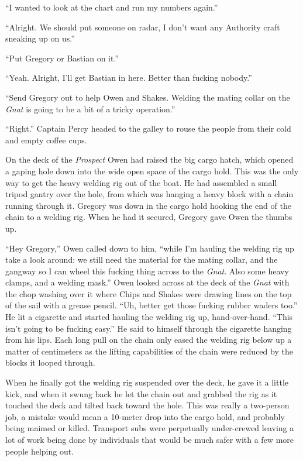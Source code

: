 \documentclass[
]{scrbook}
\begin{document}
``I wanted to look at the chart and run my numbers again.''

``Alright. We should put someone on radar, I don't want any Authority
craft sneaking up on us.''

``Put Gregory or Bastian on it.''

``Yeah. Alright, I'll get Bastian in here. Better than fucking nobody.''

``Send Gregory out to help Owen and Shakes. Welding the mating collar on
the \emph{Gnat} is going to be a bit of a tricky operation.''

``Right.'' Captain Percy headed to the galley to rouse the people from
their cold and empty coffee cups.

On the deck of the \emph{Prospect} Owen had raised the big cargo hatch,
which opened a gaping hole down into the wide open space of the cargo
hold. This was the only way to get the heavy welding rig out of the
boat. He had assembled a small tripod gantry over the hole, from which
was hanging a heavy block with a chain running through it. Gregory was
down in the cargo hold hooking the end of the chain to a welding rig.
When he had it secured, Gregory gave Owen the thumbs up.

``Hey Gregory,'' Owen called down to him, ``while I'm hauling the
welding rig up take a look around: we still need the material for the
mating collar, and the gangway so I can wheel this fucking thing across
to the \emph{Gnat}. Also some heavy clamps, and a welding mask.'' Owen
looked across at the deck of the \emph{Gnat} with the chop washing over
it where Chips and Shakes were drawing lines on the top of the sail with
a grease pencil. ``Uh, better get those fucking rubber waders too.'' He
lit a cigarette and started hauling the welding rig up, hand-over-hand.
``This isn't going to be fucking easy.'' He said to himself through the
cigarette hanging from his lips. Each long pull on the chain only eased
the welding rig below up a matter of centimeters as the lifting
capabilities of the chain were reduced by the blocks it looped through.

When he finally got the welding rig suspended over the deck, he gave it
a little kick, and when it swung back he let the chain out and grabbed
the rig as it touched the deck and tilted back toward the hole. This was
really a two-person job, a mistake would mean a 10-meter drop into the
cargo hold, and probably being maimed or killed. Transport subs were
perpetually under-crewed leaving a lot of work being done by individuals
that would be much safer with a few more people helping out.
\end{document}

